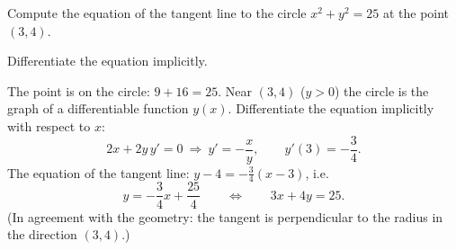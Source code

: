 
\begin{question}
Compute the equation of the tangent line to the circle $x^2+y^2=25$ at the point $(3,4)$.
\end{question}

\begin{hint}
Differentiate the equation implicitly.
\end{hint}

\begin{solution}
The point is on the circle: $9+16=25$. Near $(3,4)$ ($y>0$) the circle is the graph of a differentiable function $y(x)$. Differentiate the equation implicitly with respect to $x$:
\[ 2x+2y\,y'=0\ \Longrightarrow\ y'=-\frac{x}{y},\qquad y'(3)=-\frac34. \]
The equation of the tangent line: $y-4=-\frac34(x-3)$, i.e.
\[ y=-\frac34x+\frac{25}{4}\qquad\Longleftrightarrow\qquad 3x+4y=25. \]
(In agreement with the geometry: the tangent is perpendicular to the radius in the direction $(3,4)$.)
\end{solution}
